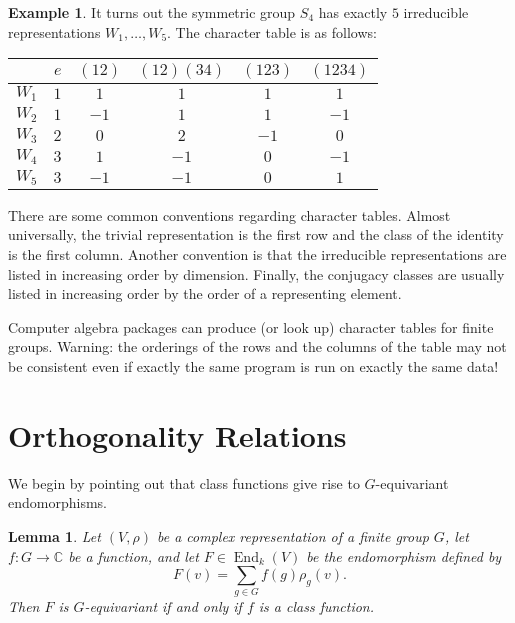 \documentclass[12pt]{article}
\theoremstyle{plain}
\newtheorem{lemma}[theorem]{Lemma}
\theoremstyle{definition}
\newtheorem{example}[theorem]{Example}
\theoremstyle{remark}
\numberwithin{equation}{section}
\begin{document}
\begin{example}
It turns out the symmetric group $S_4$ has exactly $5$ irreducible
representations $W_1, \ldots, W_5$.
The character table is as follows:
\begin{center}
\begin{tabular}{|c|c|c|c|c|c|}
\hline 
 & $e $ & $(12)$ & $(12)(34)$ & $(123)$ & $(1234)$\\
\hline 
\hline 
$W_1$ & $1$ & $1$ & $1$ & $1$ & $1$\\
\hline 
$W_2$ & $1$ & $-1$ & $1$ & $1$ & $-1$\\
\hline 
$W_3$ & $2$ & $0$ & $2$ & $-1$ & $0$\\
\hline 
$W_4$ & $3$ & $1$ & $-1$ & $0$ & $-1$\\
\hline 
$W_5$ & $3$ & $-1$ & $-1$ & $0$ & $1$\\
\hline 
\end{tabular}
\end{center}
\end{example}

There are some common conventions regarding character tables.
Almost universally,
the trivial representation is the first row and the class of the
identity is the first column.
Another convention is that the irreducible representations are listed in
increasing order by dimension.
Finally, the conjugacy classes are usually listed in increasing order by
the order of a representing element.

Computer algebra packages can produce (or look up) character tables
for finite groups.  Warning: the orderings of the rows and the columns of the
table may not be consistent even if exactly the same program is run on
exactly the same data!

\section{Orthogonality Relations}

We begin by pointing out that class functions give rise to
$G$-equivariant endomorphisms.

\begin{lemma} \label{lem:class_function_endo}
Let $(V,\rho)$ be a complex representation of a finite group $G$,
let $f : G \to \mathbb{C}$ be a function, and let $F \in
\operatorname{End}_k(V)$ be the endomorphism defined by
\[
F(v) = \sum_{g \in G} f(g)\rho_g(v) .
\]
Then $F$ is $G$-equivariant if and only if $f$ is a class function.
\end{lemma}
\end{document}
